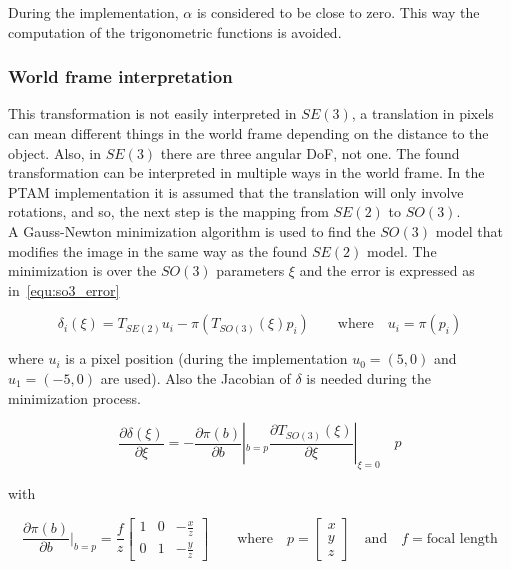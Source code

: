 During the implementation, $\alpha$ is considered to be close to zero. This way the computation of the trigonometric functions is avoided.\\






\subsubsection{World frame interpretation}
\label{ssub:world_frame_interpretation}

This transformation is not easily interpreted in $SE(3)$, a translation in pixels can mean different things in the world frame depending on the distance to the object. Also, in $SE(3)$ there are three angular DoF, not one. The found transformation can be interpreted in multiple ways in the world frame. In the PTAM implementation it is assumed that the translation will only involve rotations, and so, the next step is the mapping from $SE(2)$ to $SO(3)$.\\

A Gauss-Newton minimization algorithm is used to find the $SO(3)$ model that modifies the image in the same way as the found $SE(2)$ model. The minimization is over the $SO(3)$ parameters $\xi$ and the error is expressed as in~\ref{equ:so3_error}

\begin{equation}
  \delta_i(\xi) = T_{SE(2)}u_i - \pi(T_{SO(3)}(\xi) p_i) \qquad \text{where} \quad u_i = \pi(p_i)
  \label{equ:so3_error}
\end{equation}


where $u_i$ is a pixel position (during the implementation $u_0=(5,0)$ and $u_1=(-5,0)$ are used). Also the Jacobian of $\delta$ is needed during the minimization process.

\begin{equation}
  \frac{\partial \delta(\xi)}{\partial \xi} = -\frac{\partial \pi (b)}{\partial b}|_{b=p} \frac{\partial T_{SO(3)}(\xi)}{\partial\xi}|_{\xi=0} \quad p
\end{equation}

with

\begin{equation}
  \frac{\partial \pi(b)}{\partial b} |_{b=p} = \frac{f}{z}
  \begin{bmatrix}
    1 & 0 & -\frac{x}{z} \\
    0 & 1 & -\frac{y}{z}
  \end{bmatrix}
  \qquad \text{where} \quad 
  p = \begin{bmatrix} x \\ y \\ z \end{bmatrix} \quad \text{and} \quad f = \text{focal length}
\end{equation}

